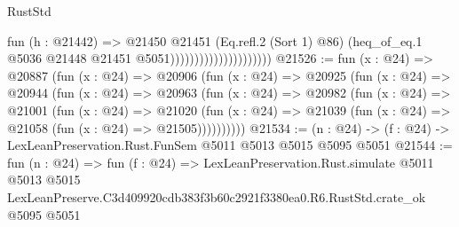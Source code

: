 \begin{lexlean}{RustStd}
\begin{coremodule}
                                          fun (h : @21442) =>
                                          @21450
                                            @21451
                                            (Eq.refl.{2} (Sort 1) @86)
                                            (heq_of_eq.{1}
                                              @5036
                                              @21448
                                              @21451
                                              @5051)))))))))))))))))))))
@21526 := fun (x : @24) =>
  @20887
    (fun (x : @24) =>
    @20906
      (fun (x : @24) =>
      @20925
        (fun (x : @24) =>
        @20944
          (fun (x : @24) =>
          @20963
            (fun (x : @24) =>
            @20982
              (fun (x : @24) =>
              @21001
                (fun (x : @24) =>
                @21020
                  (fun (x : @24) =>
                  @21039 (fun (x : @24) => @21058 (fun (x : @24) => @21505))))))))))
@21534 := (n : @24) -> (f : @24) -> LexLeanPreservation.Rust.FunSem @5011 @5013 @5015 @5095 @5051
@21544 := fun (n : @24) =>
  fun (f : @24) =>
  LexLeanPreservation.Rust.simulate
    @5011
    @5013
    @5015
    LexLeanPreserve.C3d409920cdb383f3b60c2921f3380ea0.R6.RustStd.crate_ok
    @5095
    @5051
\end{coremodule}
\end{lexlean}
